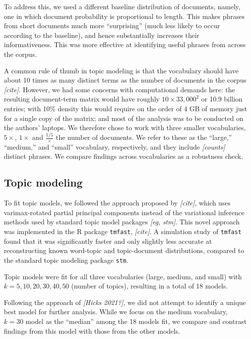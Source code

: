 \documentclass[12pt]{article}
\begin{document}
To address this, we used a different baseline distribution of documents, namely, one in which document probability is proportional to length. This makes phrases from short documents much more ``surprising'' (much less likely to occur according to the baseline), and hence substantially increases their informativeness. This was more effective at identifying useful phrases from across the corpus.

A common rule of thumb in topic modeling is that the vocabulary should have about 10 times as many distinct terms as the number of documents in the corpus \emph{{[}cite{]}}. However, we had some concerns with computational demands here: the resulting document-term matrix would have roughly \(10 \times 33,000^2\) or 10.9 billion entries; with 10\% density this would require on the order of 4 GB of memory just for a single copy of the matrix; and most of the analysis was to be conducted on the authors' laptops. We therefore chose to work with three smaller vocabularies, \(5 \times\), \(1 \times\) and \(\frac{1/5} \times\) the number of documents. We refer to these as the ``large,'' ``medium,'' and ``small'' vocabulary, respectively, and they include \emph{{[}counts{]}} distinct phrases. We compare findings across vocabularies as a robustness check.

\hypertarget{topic-modeling}{%
\subsection*{Topic modeling}\label{topic-modeling}}

To fit topic models, we followed the approach proposed by \emph{{[}cite{]}}, which uses varimax-rotated partial principal components instead of the variational inference methods used by standard topic model packages \emph{{[}eg, stm{]}}. This novel approach was implemented in the R package \texttt{tmfast}, \emph{{[}cite{]}}. A simulation study of \texttt{tmfast} found that it was significantly faster and only slightly less accurate at reconstructing known word-topic and topic-document distributions, compared to the standard topic modeling package \texttt{stm}.

Topic models were fit for all three vocabularies (large, medium, and small) with \(k = 5, 10, 20, 30, 40, 50\) (number of topics), resulting in a total of 18 models.

Following the approach of \emph{{[}Hicks 2021?{]}}, we did not attempt to identify a unique best model for further analysis. While we focus on the medium vocabulary, \(k=30\) model as the ``median'' among the 18 models fit, we compare and contrast findings from this model with those from the other models.
\end{document}
